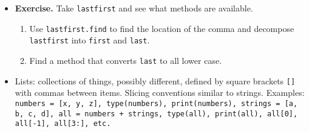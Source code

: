 \documentclass[11pt]{article}
\begin{document}
\begin{itemize}
\item {\bf Exercise.}  Take {\tt lastfirst} and see what methods are available.
\begin{enumerate}[label=(\alph*)]
\item Use {\tt lastfirst.find} to find the location of the comma and
decompose {\tt lastfirst} into {\tt first} and {\tt last}.
\item Find a method that converts {\tt last} to all lower case.
\end{enumerate}

\item Lists: collections of things, possibly different, defined by square brackets
{\tt []} with commas between items.
Slicing conventions similar to strings.
Examples:  {\tt numbers = [x, y, z], type(numbers),
print(numbers),
strings = [a, b, c, d],
all = numbers + strings, type(all),
print(all),
all[0], all[-1], all[3:], etc.}

\end{itemize}
\end{document}
